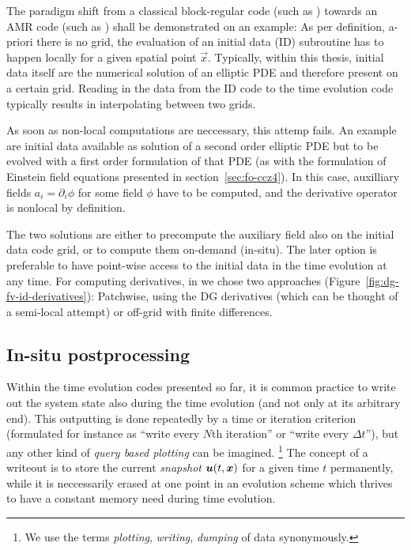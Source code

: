 The paradigm shift from a classical block-regular code (such as ) towards
an AMR code (such as ) shall be demonstrated on an example: As per
definition, a-priori there is no grid, the evaluation of an initial data
(ID)
subroutine has to happen locally for a given spatial point $\vec x$. Typically,
within this thesis, initial data itself are the numerical solution of an
elliptic PDE and therefore present on a certain grid. Reading in the data from
the ID code to the time evolution code typically results in interpolating
between two grids.

As soon as non-local computations are neccessary, this attemp fails. An example
are initial data available as solution of a second order elliptic PDE but
to be evolved with a first order formulation of that PDE (as with the 
formulation of Einstein field equations presented in 
section~\ref{sec:fo-ccz4}). In this case,
auxilliary fields $a_i = \partial_i \phi$ for some field $\phi$ have to be
computed, and the derivative operator is nonlocal by definition.

The two solutions are either to precompute the auxiliary field also on the
initial data code grid, or to compute them on-demand (in-situ). The later
option is preferable to have point-wise access to the initial data in the
time evolution at any time. For computing derivatives, in  we chose
two approaches (Figure~\ref{fig:dg-fv-id-derivatives}): Patchwise, using
the DG derivatives (which can be thought of a semi-local attempt) or off-grid with finite
differences.

\subsection{In-situ postprocessing}
Within the time evolution codes presented so far, it is common practice to
write out the system state also during the time evolution (and not only at
its arbitrary end). This outputting is done repeatedly by a time or iteration
criterion (formulated for instance as ``write every $N$th iteration'' or 
``write every $\Delta t$''), but any other kind of \emph{query based plotting}
can be imagined. \footnote{We use the terms \emph{plotting}, \emph{writing},
	\emph{dumping} of data synonymously.
} The concept of a writeout is to store 
the current \emph{snapshot}
$\boldsymbol{u}(t,\boldsymbol{x})$ for a given time $t$ permanently, while it is neccessarily erased
at one point in an evolution scheme which thrives to have a constant memory
need during time evolution.

